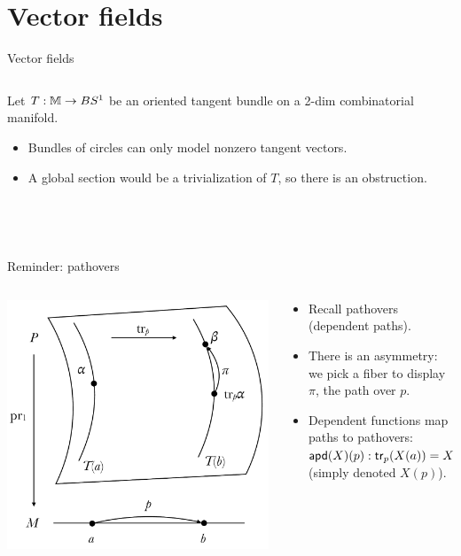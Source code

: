 \section{Vector fields}

\begin{frame}{Vector fields}
\begin{columns}
\begin{column}{0.7\textwidth}
Let \( T:\mathbb{M}\to BS^1 \) be an oriented tangent bundle on a 2-dim combinatorial manifold.
\begin{itemize}
\item Bundles of circles can only model \alert{nonzero} tangent vectors.
\item  A global section would be a trivialization of \( T \), so there is an obstruction.
\end{itemize}
\quad\\~\\
\end{column}
\begin{column}{0.3\textwidth}

\end{column}
\end{columns}
\end{frame}

\begin{frame}{Reminder: pathovers}
\begin{columns}
\begin{column}{0.35\textwidth}
\includegraphics[width=30ex]{figs/pathovers.pdf}
\end{column}
\begin{column}{0.65\textwidth}
\begin{itemize}
\item Recall pathovers (dependent paths).
\item There is an asymmetry: we pick a fiber to display \( \pi \), the path over \( p \).
\item Dependent functions map paths to pathovers: \( \mathsf{apd} (X)(p):\mathsf{tr}_p(X(a))=X(b) \) (simply denoted \( X(p) \)).
\end{itemize}
\end{column}
\end{columns}
\end{frame}

